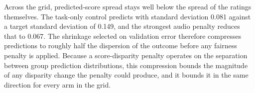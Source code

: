 Across the grid, predicted-score spread stays well below the spread of the ratings
themselves. The task-only control predicts with standard deviation 0.081 against a target
standard deviation of 0.149, and the strongest audio penalty reduces that to 0.067. The
shrinkage selected on validation error therefore compresses predictions to roughly half the
dispersion of the outcome before any fairness penalty is applied. Because a score-disparity
penalty operates on the separation between group prediction distributions, this compression
bounds the magnitude of any disparity change the penalty could produce, and it bounds it in
the same direction for every arm in the grid.
